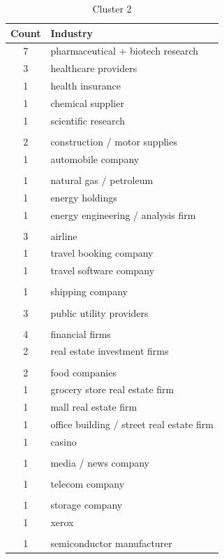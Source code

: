\documentclass[final]{article}
\begin{document}
\begin{table}[H]
\centering
\caption{Cluster 2}
\label{c2}
\begin{tabular}{@{}cl@{}}
  \toprule
  Count & Industry  \\ \midrule
  7 & pharmaceutical + biotech research \\
  3 & healthcare providers \\
  1 & health insurance \\
  1 & chemical supplier \\
  1 & scientific research \\
        & \\
  2 & construction / motor supplies \\
  1 & automobile company \\
        & \\
  1 & natural gas / petroleum \\
  1 & energy holdings \\
  1 & energy engineering / analysis firm \\
        & \\
  3 & airline \\
  1 & travel booking company \\
  1 & travel software company \\
        & \\
  1 & shipping company \\
        & \\
  3 & public utility providers \\
        & \\
  4 & financial firms \\
  2 & real estate investment firms \\
        & \\
  2 & food companies \\
  1 & grocery store real estate firm \\
  1 & mall real estate firm \\
  1 & office building / street real estate firm \\
  1 & casino \\
        & \\
  1 & media / news company \\
        & \\
  1 & telecom company \\
        & \\
  1 & storage company \\
  1 & xerox \\
        & \\
  1 & semiconductor manufacturer\\
  \bottomrule
\end{tabular}
\end{table}
\end{document}

